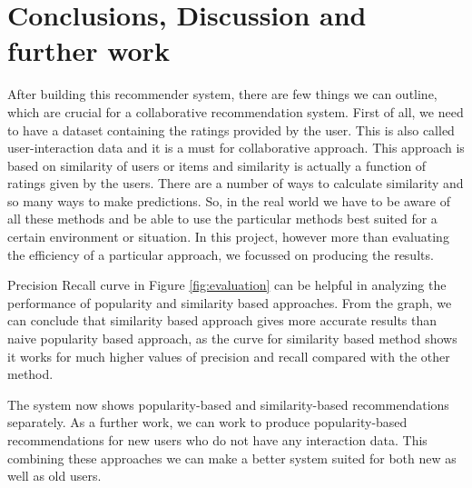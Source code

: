 \documentclass{jot}
\begin{document}
\section{Conclusions, Discussion and further work}

After building this recommender system, there are few things we can outline, which are crucial for a collaborative recommendation system. First of all, we need to have a dataset containing the ratings provided by the user. This is also called user-interaction data and it is a must for collaborative approach. This approach is based on similarity of users or items and similarity is actually a function of ratings given by the users. There are a number of ways to calculate similarity and so many ways to make predictions. So, in the real world we have to be aware of all these methods and be able to use the particular methods best suited for a certain environment or situation. In this project, however more than evaluating the efficiency of a particular approach, we focussed on producing the results.

Precision Recall curve in Figure \ref{fig:evaluation} can be helpful in analyzing the performance of popularity and similarity based approaches. From the graph, we can conclude that similarity based approach gives more accurate results than naive popularity based approach, as the curve for similarity based method shows it works for much higher values of precision and recall compared with the other method.

The system now shows popularity-based and similarity-based recommendations separately. As a further work, we can work to produce popularity-based recommendations for new users who do not have any interaction data. This combining these approaches we can make a better system suited for both new as well as old users.

\backmatter

\nocite{*}



\abouttheauthors
\end{document}
